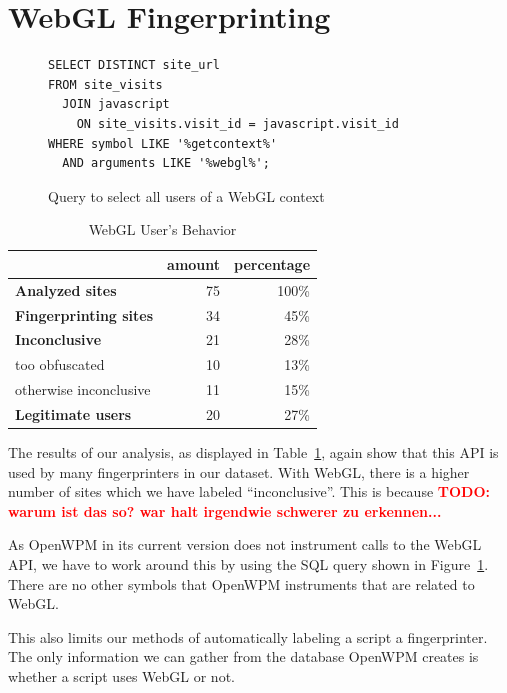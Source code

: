 \documentclass[
    fontsize=12pt,
    headings=small,
    parskip=half,
    bibliography=totoc,
    numbers=noenddot,
    open=any
    ]{scrreprt}
\newcommand{\todo}[1]{\textcolor{red}{\textbf{TODO: #1}}}
\begin{document}
\section{WebGL Fingerprinting}

\begin{figure}
\begin{verbatim}
SELECT DISTINCT site_url
FROM site_visits
  JOIN javascript
    ON site_visits.visit_id = javascript.visit_id
WHERE symbol LIKE '%getcontext%'
  AND arguments LIKE '%webgl%';
\end{verbatim}
\caption{Query to select all users of a WebGL context}
\label{code:webgl_query}
\end{figure}

\begin{table}
\centering
\caption{WebGL User's Behavior}
\begin{tabular}{l r r}
    \toprule
    & amount & percentage \\
    \midrule
    \textbf{Analyzed sites} & 75 & 100\% \\
    \midrule
    \textbf{Fingerprinting sites} & 34 & 45\% \\
    \midrule
    \textbf{Inconclusive} & 21 & 28\% \\
    too obfuscated & 10 & 13\% \\
    otherwise inconclusive & 11 & 15\% \\
    \midrule
    \textbf{Legitimate users} & 20 & 27\% \\
    \bottomrule
\end{tabular}
\label{table:webgl_users}
\end{table}

The results of our analysis, as displayed in Table~\ref{table:webgl_users}, again show that this
API is used by many fingerprinters in our dataset.
With WebGL, there is a higher number of sites which we have labeled ``inconclusive''.
This is because \todo{warum ist das so? war halt irgendwie schwerer zu erkennen...}

As OpenWPM in its current version does not instrument calls to the WebGL API, we have to
work around this by using the SQL query shown in Figure~\ref{code:webgl_query}.
There are no other symbols that OpenWPM instruments that are related to WebGL.

This also limits our methods of automatically labeling a script a fingerprinter.
The only information we can gather from the database OpenWPM creates
is whether a script uses WebGL or not.
\end{document}

